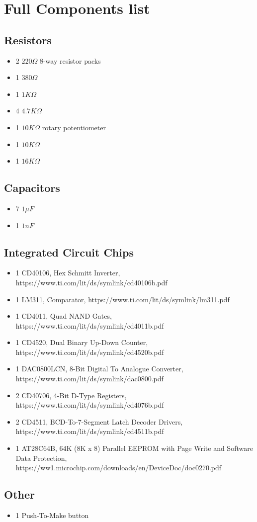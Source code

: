 \chapter{Full Components list}
\section{Resistors}
\begin{itemize}
    \item 2 $220\Omega$ 8-way resistor packs
    \item 1 $380\Omega$ 
    \item 1 $1K\Omega$
    \item 4 $4.7K\Omega$
    \item 1 $10K\Omega$ rotary potentiometer
    \item 1 $10K\Omega$
    \item 1 $16K\Omega$
\end{itemize}

\section{Capacitors}
\begin{itemize}
    \item 7 $1\mu F$
    \item 1 $1nF$
\end{itemize}

\section{Integrated Circuit Chips}
\begin{itemize}
    \item 1 CD40106, Hex Schmitt Inverter, https://www.ti.com/lit/ds/symlink/cd40106b.pdf
    \item 1 LM311, Comparator, https://www.ti.com/lit/ds/symlink/lm311.pdf
    \item 1 CD4011, Quad NAND Gates, https://www.ti.com/lit/ds/symlink/cd4011b.pdf
    \item 1 CD4520, Dual Binary Up-Down Counter, https://www.ti.com/lit/ds/symlink/cd4520b.pdf
    \item 1 DAC0800LCN, 8-Bit Digital To Analogue Converter,\\ https://www.ti.com/lit/ds/symlink/dac0800.pdf
    \item 2 CD40706, 4-Bit D-Type Registers, https://www.ti.com/lit/ds/symlink/cd4076b.pdf
    \item 2 CD4511, BCD-To-7-Segment Latch Decoder Drivers,\\ https://www.ti.com/lit/ds/symlink/cd4511b.pdf
    \item 1 AT28C64B, 64K (8K x 8) Parallel EEPROM with Page Write and Software Data Protection, https://ww1.microchip.com/downloads/en/DeviceDoc/doc0270.pdf
\end{itemize}

\section{Other}
\begin{itemize}
    \item 1 Push-To-Make button
\end{itemize}

